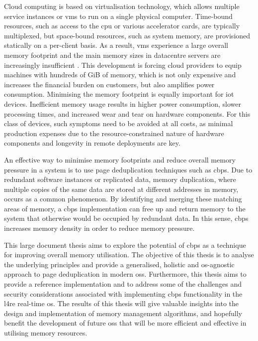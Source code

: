 Cloud computing is based on virtualisation technology, which allows multiple service instances or \acp{vm} to run on a single physical computer.
Time-bound resources, such as access to the \ac{cpu} or various accelerator cards, are typically multiplexed, but space-bound resources, such as system memory, are provisioned statically on a per-client basis.
As a result, \acp{vm} experience a large overall memory footprint and the main memory sizes in datacentre servers are increasingly insufficient \cite{de2008}.
This development is forcing cloud providers to equip machines with hundreds of GiB of memory, which is not only expensive and increases the financial burden on customers, but also amplifies power consumption.
Minimising the memory footprint is equally important for \Ac{iot} devices.
Inefficient memory usage results in higher power consumption, slower processing times, and increased wear and tear on hardware components.
For this class of devices, such symptoms need to be avoided at all costs, as minimal production expenses due to the resource-constrained nature of hardware components and longevity in remote deployments are key.

An effective way to minimise memory footprints and reduce overall memory pressure in a system is to use page deduplication techniques such as \acf{cbps}.
Due to redundant software instances or replicated data, memory duplication, where multiple copies of the same data are stored at different addresses in memory, occurs as a common phenomenon.
By identifying and merging these matching areas of memory, a \ac{cbps} implementation can free up and return memory to the system that otherwise would be occupied by redundant data.
In this sense, \ac{cbps} increases memory density in order to reduce memory pressure.

This large document thesis aims to explore the potential of \ac{cbps} as a technique for improving overall memory utilisation.
The objective of this thesis is to analyse the underlying principles and provide a generalised, holistic and \ac{os}-agnostic approach to page deduplication in modern \acp{os}.
Furthermore, this thesis aims to provide a reference implementation and to address some of the challenges and security considerations associated with implementing \ac{cbps} functionality in the \ac{l4re} real-time \ac{os}.
The results of this thesis will give valuable insights into the design and implementation of memory management algorithms, and hopefully benefit the development of future \acp{os} that will be more efficient and effective in utilising memory resources.
